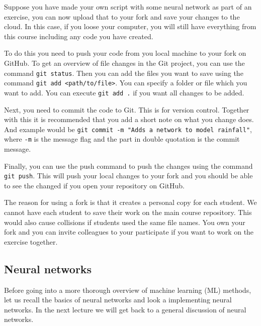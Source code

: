 \documentclass[12pt,a4paper]{article} %
\numberwithin{equation}{section}
\begin{document}
		Suppose you have made your own script with some neural network as part of an exercise, you can now upload that to your fork and save your changes to the cloud. In this case, if you loose your computer, you will still have everything from this course including any code you have created.
		
		To do this you need to push your code from you local machine to your fork on GitHub. To get an overview of file changes in the Git project, you can use the command \texttt{git status}. Then you can add the files you want to save using the command \texttt{git add <path/to/file>}. You can specify a folder or file which you want to add. You can execute \texttt{git add .} if you want all changes to be added. 
		
		Next, you need to commit the code to Git. This is for version control. Together with this it is recommended that you add a short note on what you change does. And example would be \texttt{git commit -m "Adds a network to model rainfall"}, where \texttt{-m} is the message flag and the part in double quotation is the commit message.
		
		Finally, you can use the push command to push the changes using the command \texttt{git push}. This will push your local changes to your fork and you should be able to see the changed if you open your repository on GitHub.
		
		The reason for using a fork is that it creates a personal copy for each student. We cannot have each student to save their work on the main course repository. This would also cause collisions if students used the same file names. You own your fork and you can invite colleagues to your participate if you want to work on the exercise together. 

	\subsection{Neural networks}
		Before going into a more thorough overview of machine learning (ML) methods, let us recall the basics of neural networks and look a implementing neural networks. In the next lecture we will get back to a general discussion of neural networks.
		
\end{document}
